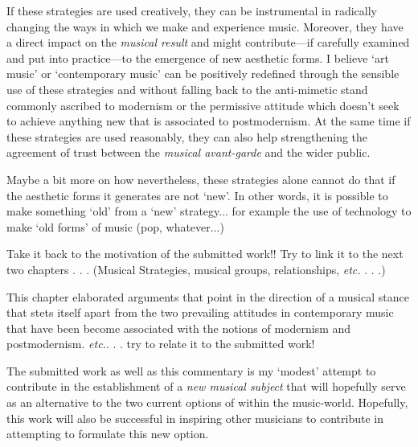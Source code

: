 If these strategies are used creatively, they can be instrumental in radically changing the ways in which we make and experience music. Moreover, they have a direct impact on the \emph{musical result} and might contribute---if carefully examined and put into practice---to the emergence of new aesthetic forms. I believe `art music' or `contemporary music' can be positively redefined through the sensible use of these strategies and without falling back to the anti-mimetic stand commonly ascribed to modernism or the permissive attitude which doesn't seek to achieve anything new that is associated to postmodernism. At the same time if these strategies are used reasonably, they can also help strengthening the agreement of trust between the \emph{musical avant-garde} and the wider public.

Maybe a bit more on how nevertheless, these strategies alone cannot do that if the aesthetic forms it generates are not `new'. In other words, it is possible to make something `old' from a `new' strategy... for example the use of technology to make `old forms' of music (pop, whatever...)

Take it back to the motivation of the submitted work!! Try to link it to the next two chapters . . . (Musical Strategies, musical groups, relationships, \emph{etc.} . . .)

This chapter elaborated arguments that point in the direction of a musical stance that stets itself apart from the two prevailing attitudes in contemporary music that have been become associated with the notions of modernism and postmodernism. \emph{etc.}. . . try to relate it to the submitted work!

The submitted work as well as this commentary is my `modest' attempt to contribute in the establishment of a \emph{new musical subject} that will hopefully serve as an alternative to the two current options of within the music-world.  Hopefully, this work will also be successful in inspiring other musicians to contribute in attempting to formulate  this new option.

\label{ch:motivation}